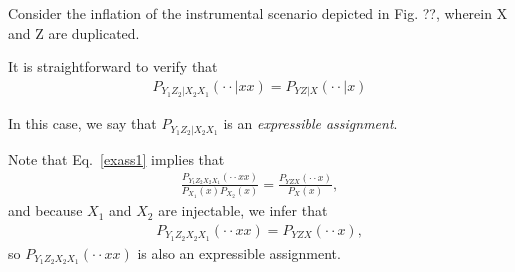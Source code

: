 \documentclass[aps,english,superscriptaddress,onecolumn,twoside,longbibliography,pra,floatfix,fleqn,nofootinbib]{revtex4-1}%
\theoremstyle{definition}
\begin{document}
Consider the inflation of the instrumental scenario depicted in Fig. ??, wherein X and Z are duplicated.

It is straightforward to verify that 
\begin{align}
P_{Y_1 Z_2 |X_2 X_1} ( \cdot \cdot | xx) = P_{Y Z |X} ( \cdot \cdot | x)
\label{exass1}
\end{align}

 In this case, we say that $P_{Y_1 Z_2 |X_2 X_1}$ is an {\em expressible assignment}.
 
 Note that Eq.~\eqref{exass1} implies that 
  \begin{align}
\frac{P_{Y_1 Z_2 X_2 X_1} ( \cdot \cdot xx)}{P_{X_1}(x)P_{X_2}(x)} = \frac{P_{Y Z X} ( \cdot \cdot x)}{P_{X}(x)},
\end{align}
and because $X_1$ and $X_2$ are injectable, we infer that 
 \begin{align}
P_{Y_1 Z_2 X_2 X_1} ( \cdot \cdot xx) = P_{Y Z X} ( \cdot \cdot x),
\end{align}
so $P_{Y_1 Z_2 X_2 X_1} ( \cdot \cdot xx)$ is also an expressible assignment. 
\end{document}
